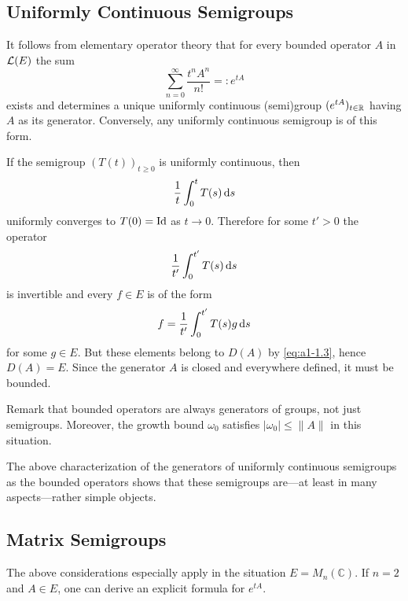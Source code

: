 \subsection{Uniformly Continuous Semigroups}\label{subsec:a1-2.1}
It follows from elementary operator theory that for every bounded operator $A$ in  $\mathcal{L}(E)$ the sum
\[
    \sum_{n=0}^{\infty} \frac{t^{n}A^{n}}{n!} = \colon e^{tA}
\]
exists and determines a unique uniformly continuous (semi)group $(e^{tA})_{t \in \mathbb{R}}$ having $A$ as its generator.
Conversely, any uniformly continuous semigroup is of this form.

If the semigroup $(T(t))_{t \geq 0}$ is uniformly continuous, then 
%
\[
	\frac{1}{t}\int_{0}^{t} T(s) \mathop{}\!\mathrm{d}{s}
\]
%
uniformly converges to $T(0) = \operatorname{Id}$ as $t \to 0$.
Therefore for some $t' > 0$ the operator 
%
\[
	\frac{1}{t'}\int_{0}^{t'} T(s) \mathop{}\!\mathrm{d}{s}
\]
%
is invertible and every $f \in E$ is of the form 
%
\[
	f = \frac{1}{t'}\int_{0}^{t'} T(s)g \mathop{}\!\mathrm{d}{s}
\]
%
for some $g \in E$.
But these elements belong to $D(A)$ by \eqref{eq:a1-1.3}, hence $D(A) = E$.
Since the generator $A$ is closed and everywhere defined, it must be bounded.

Remark that bounded operators are always generators of groups, not just semigroups.
Moreover, the growth bound $\omega_0$ satisfies $|\omega_0| \leq \|A\|$ in this situation.

The above characterization of the generators of uniformly continuous semigroups as the bounded operators shows that these semigroups are---at least in many aspects---rather simple objects.
\subsection{Matrix Semigroups}\label{subsec:a1-2.2}
The above considerations especially apply in the situation $E = M_{n}(\mathbb{C})$.
If $n = 2$ and $A \in E$, one can derive an explicit formula for $e^{tA}$. 

